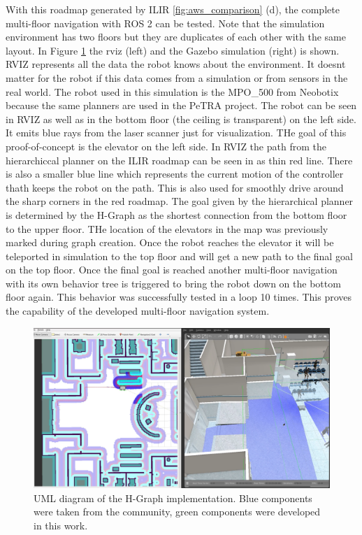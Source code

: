 With this roadmap generated by ILIR \ref{fig:aws_comparison} (d), the complete multi-floor navigation with ROS 2 can be tested. Note that the simulation environment has two floors but they are duplicates of each other with the same layout. In Figure \ref{fig:aws_neobotix_simulation} the \gls{rviz} (left) and the Gazebo simulation (right) is shown. RVIZ represents all the data the robot knows about the environment. It doesnt matter for the robot if this data comes from a simulation or from sensors in the real world. The robot used in this simulation is the MPO\_500 from Neobotix because the same planners are used in the PeTRA project. The robot can be seen in RVIZ as well as in the bottom floor (the ceiling is transparent) on the left side. It emits blue rays from the laser scanner just for visualization. THe goal of this proof-of-concept is the elevator on the left side. In RVIZ the path from the hierarchiccal planner on the ILIR roadmap can be seen in as thin red line. There is also a smaller blue line which represents the current motion of the controller thath keeps the robot on the path. This is also used for smoothly drive around the sharp corners in the red roadmap. The goal given by the hierarchical planner is determined by the H-Graph as the shortest connection from the bottom floor to the upper floor. THe location of the elevators in the map was previously marked during graph creation. Once the robot reaches the elevator it will be teleported in simulation to the top floor and will get a new path to the final goal on the top floor. Once the final goal is reached another multi-floor navigation with its own behavior tree is triggered to bring the robot down on the bottom floor again. This behavior was successfully tested in a loop 10 times. This proves the capability of the developed multi-floor navigation system. 

\begin{figure}[h]
    \centering
    \includegraphics[width=\textwidth]{figures/60_results/aws_neobotix_simulation.png}
    \caption[UML diagram of the H-Graph implementation]{UML diagram of the H-Graph implementation. Blue components were taken from the community, green components were developed in this work.}
    \label{fig:aws_neobotix_simulation}
\end{figure}
